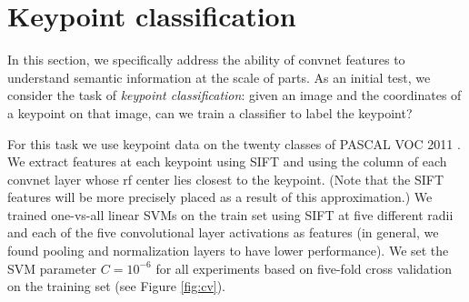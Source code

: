 \documentclass{article} \usepackage{nips14submit_e,times}
\begin{document}
\begin{table}
\centering
\caption{
Keypoint transfer accuracy using convnet flow, SIFT flow, and simple copying
from nearest neighbors. Accuracy (PCK) is shown per category using $\alpha = 0.1$ (see
text) and means are also shown for the stricter values $\alpha = 0.05$ and
$0.025$. On average, convnet flow performs as well as SIFT flow, and performs a
bit better for stricter tolerances.
}
\label{tab:align}
\end{table}




\section{Keypoint classification}

In this section, we specifically address the ability of convnet features to
understand semantic information at the scale of parts.
As an initial test, we consider the task of \emph{keypoint classification}:
given an image and the coordinates of a keypoint on that image, can we train a classifier to label
the keypoint?

For this task we use keypoint data \cite{BourdevMalikICCV09} on the twenty classes
of PASCAL VOC 2011 \cite{pascal}.
We extract features at each keypoint using SIFT \cite{SIFT} and using the column
of each convnet layer whose rf center lies closest to the keypoint. (Note that the
SIFT  features will be more precisely placed as a result of this approximation.)
We trained one-vs-all linear SVMs on the train set using SIFT at five different
radii and each of the five convolutional layer activations
as features (in general, we found pooling and normalization layers to have lower
performance).
We set the SVM parameter $C = 10^{-6}$ for all experiments based on five-fold cross validation on
the training set (see Figure \ref{fig:cv}).
\end{document}
